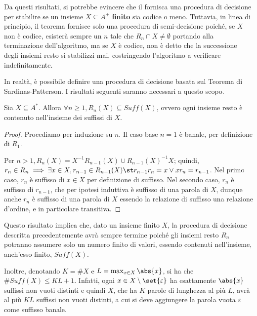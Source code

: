 Da questi risultati, si potrebbe evincere che il  fornisca una procedura di decisione per stabilire se un insieme \(X \subseteq A^+\) \textbf{finito} sia codice o meno.
Tuttavia, in linea di principio, il teorema fornisce solo una procedura di semi-decisione poiché, se \(X\) non è codice, esisterà sempre un \(n\) tale che \(R_n \cap X \neq \emptyset\) portando alla terminazione dell'algoritmo, ma se \(X\) è codice, non è detto che la successione degli insiemi resto si stabilizzi mai, costringendo l'algoritmo a verificare indefinitamente.

In realtà, è possibile definire una procedura di decisione basata sul Teorema di Sardinas-Patterson.
I risultati seguenti saranno necessari a questo scopo.
\begin{proposition}[label=prop:rest_sets_subset_suffix]{}
  Sia \(X \subseteq A^*\). Allora \(\forall n \geq 1, R_n(X) \subseteq Suff(X)\), ovvero ogni insieme resto è contenuto nell'insieme dei suffissi di \(X\).
\end{proposition}
\begin{proof}
  Procediamo per induzione su \(n\).
  Il caso base \(n=1\) è banale, per definizione di \(R_1\).

  Per \(n>1, R_n(X)=X^{-1}R_{n-1}(X) \cup {R_{n-1}(X)}^{-1}X\); quindi, \(r_n \in R_n \implies \exists x \in X, r_{n-1}\in R_{n-1}(X) \st r_{n-1}r_n = x \lor xr_n = r_{n-1}\).
  Nel primo caso, \(r_n\) è suffisso di \(x \in X\) per definizione di suffisso.
  Nel secondo caso, \(r_{n}\) è suffisso di \(r_{n-1}\), che per ipotesi induttiva è suffisso di una parola di \(X\), dunque anche \(r_n\) è suffisso di una parola di \(X\) essendo la relazione di suffisso una relazione d'ordine, e in particolare transitiva.
\end{proof}

Questo risultato implica che, dato un insieme finito \(X\), la procedura di decisione descritta precedentemente avrà sempre termine poiché gli insiemi resto \(R_n\) potranno assumere solo un numero finito di valori, essendo contenuti nell'insieme, anch'esso finito, \(Suff(X)\).

Inoltre, denotando \(K = \# X\) e \(L = \max_{x \in X} \abs{x}\), si ha che \(\# Suff(X) \leq KL+1\).
Infatti, ogni \( x \in X \setminus \set{\varepsilon}\) ha esattamente \(\abs{x}\) suffissi non vuoti distinti e quindi \(X\), che ha \(K\) parole di lunghezza al più \(L\), avrà al più \(KL\) suffissi non vuoti distinti, a cui si deve aggiungere la parola vuota \(\varepsilon\) come suffisso banale.

